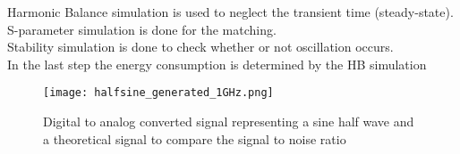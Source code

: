 Harmonic Balance simulation is used to neglect the transient time (steady-state).
\\ S-parameter simulation is done for the matching.\\ Stability simulation is done to check whether or not oscillation occurs. \\ In the last step the energy consumption is determined by the HB simulation\\




\begin{figure}[ht]
	\centering
  \texttt{[image: halfsine\_generated\_1GHz.png]}
	\caption{Digital to analog converted signal representing a sine half wave and a theoretical signal to compare the signal to noise ratio}
	\label{halfsine}
\end{figure}
